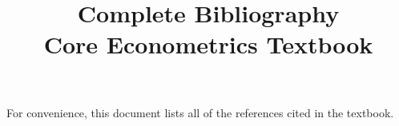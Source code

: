 \documentclass[nohyper]{external/tufte-handout}
\title{Complete Bibliography \\
       Core Econometrics Textbook}
\begin{document}
\maketitle

For convenience, this document lists all of the references cited in
the textbook.

\nocite{*}


\end{document}

